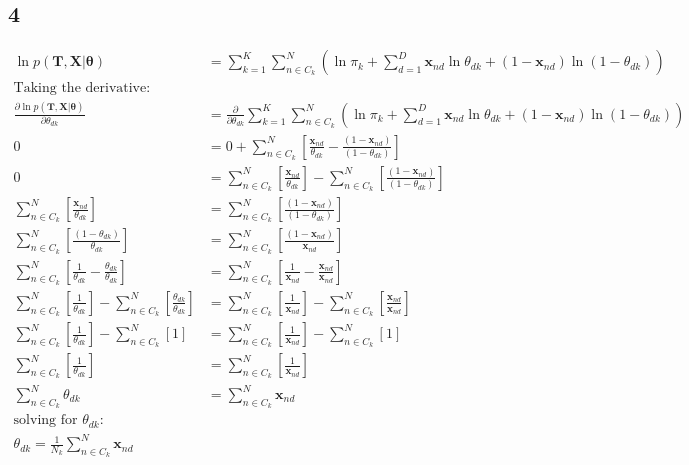 \documentclass[a4paper]{article}
\begin{document}
\subsection*{4}

\begin{align*}
    \ln{p(\pmb{T}, \pmb{X} | \pmb{\theta})} &= \sum_{k=1}^{K}\sum_{n \in C_k}^{N} \left ( \ln{\pi_{k}} + \sum_{d=1}^{D}\pmb{x}_{nd}\ln{\theta_{dk}} +
    (1-\pmb{x}_{nd})\ln{(1 - \theta_{dk})} \right )\\
    \text{Taking the derivative:}\\
    \frac{\partial\ln{p(\pmb{T}, \pmb{X} | \pmb{\theta})}}{\partial \theta_{dk}} &= \frac{\partial}{\partial \theta_{dk}}\sum_{k=1}^{K}\sum_{n \in C_k}^{N} \left ( \ln{\pi_{k}} + \sum_{d=1}^{D}\pmb{x}_{nd}\ln{\theta_{dk}} +
    (1-\pmb{x}_{nd})\ln{(1 - \theta_{dk})} \right )\\
   0 &= 0 + \sum_{n \in C_k}^{N} \left[ \frac{\pmb{x}_{nd}}{\theta_{dk}} -
    \frac{(1-\pmb{x}_{nd})}{(1 - \theta_{dk})}  \right] \\
   0 &= \sum_{n \in C_k}^{N} \left[ \frac{\pmb{x}_{nd}}{\theta_{dk}}\right] -
   \sum_{n \in C_k}^{N} \left[ \frac{(1-\pmb{x}_{nd})}{(1 - \theta_{dk})}  \right] \\
   \sum_{n \in C_k}^{N} \left[ \frac{\pmb{x}_{nd}}{\theta_{dk}}\right] &=
   \sum_{n \in C_k}^{N} \left[ \frac{(1-\pmb{x}_{nd})}{(1 - \theta_{dk})}  \right] \\
   \sum_{n \in C_k}^{N} \left[ \frac{(1 - \theta_{dk})}{\theta_{dk}}\right] &=
   \sum_{n \in C_k}^{N} \left[ \frac{(1-\pmb{x}_{nd})}{\pmb{x}_{nd}}  \right] \\
   \sum_{n \in C_k}^{N} \left[ \frac{1}{\theta_{dk}} - \frac{\theta_{dk}}{\theta_{dk}}\right] &=
   \sum_{n \in C_k}^{N} \left[ \frac{1}{\pmb{x}_{nd}} - \frac{\pmb{x}_{nd}}{\pmb{x}_{nd}}  \right] \\
   \sum_{n \in C_k}^{N} \left[ \frac{1}{\theta_{dk}}\right] - \sum_{n \in C_k}^{N} \left[\frac{\theta_{dk}}{\theta_{dk}}\right] &=
   \sum_{n \in C_k}^{N} \left[ \frac{1}{\pmb{x}_{nd}}\right]  - \sum_{n \in C_k}^{N} \left[\frac{\pmb{x}_{nd}}{\pmb{x}_{nd}}  \right] \\
   \sum_{n \in C_k}^{N} \left[ \frac{1}{\theta_{dk}}\right] - \sum_{n \in C_k}^{N} \left[1 \right] &=
   \sum_{n \in C_k}^{N} \left[ \frac{1}{\pmb{x}_{nd}}\right]  - \sum_{n \in C_k}^{N} \left[ 1 \right] \\
   \sum_{n \in C_k}^{N} \left[ \frac{1}{\theta_{dk}}\right] &=
   \sum_{n \in C_k}^{N} \left[ \frac{1}{\pmb{x}_{nd}}\right] \\
   \sum_{n \in C_k}^{N} \theta_{dk} &= \sum_{n \in C_k}^{N} \pmb{x}_{nd} \\
   \text{solving for } \theta_{dk} \text{:}\\
   \theta_{dk} = \frac{1}{N_{k}} \sum_{n \in C_k}^{N} \pmb{x}_{nd} \\
\end{align*}{}
\end{document}
